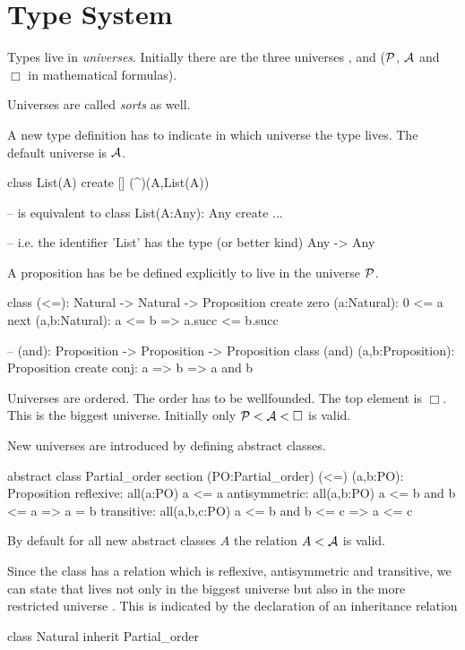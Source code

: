 \section{Type System}

Types live in \emph{universes}. Initially there are the three universes
,  and  ($\cal{P}$, $\cal{A}$ and $\Box$ in
mathematical formulas).

Universes are called \emph{sorts} as well.

A new type definition has to indicate in which universe the type lives. The
default universe is $\cal{A}$.

\begin{alba}
  class List(A) create [] (^)(A,List(A))

  -- is equivalent to
  class List(A:Any): Any create ...

  -- i.e. the identifier 'List' has the type (or better kind)
  Any -> Any
\end{alba}

A proposition has be be defined explicitly to live in the universe $\cal{P}$.
%
\begin{alba}
  class (<=): Natural -> Natural -> Proposition create
    zero (a:Natural): 0 <= a
    next (a,b:Natural): a <= b => a.succ <= b.succ

  -- (and): Proposition -> Proposition -> Proposition
  class (and) (a,b:Proposition): Proposition create
    conj: a => b => a and b
\end{alba}

Universes are ordered. The order has to be wellfounded. The top element is
$\Box$. This is the biggest universe. Initially only $\cal{P} < \cal{A} < \Box$ is
valid.

New universes are introduced by defining abstract classes.
\begin{alba}
  abstract class Partial_order
    section (PO:Partial_order)
      (<=) (a,b:PO): Proposition
      reflexive: all(a:PO)
        a <= a
      antisymmetric: all(a,b:PO)
        a <= b  and  b <= a
        =>  a = b
      transitive: all(a,b,c:PO)
        a <= b and b <= c
        => a <= c
\end{alba}
%
By default for all new abstract classes $A$ the relation $A < \cal{A}$ is
valid.

Since the class  has a relation \code{<=} which is reflexive,
antisymmetric and transitive, we can state that  lives not only
in the biggest universe  but also in the more restricted universe
. This is indicated by the declaration of an
inheritance relation
%
\begin{alba}
  class Natural inherit Partial_order
\end{alba}

